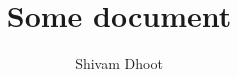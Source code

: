 \documentclass{report} %
\title{Some document}
\author{Shivam Dhoot}
\begin{document}
\maketitle

\blinddocument
\end{document}
